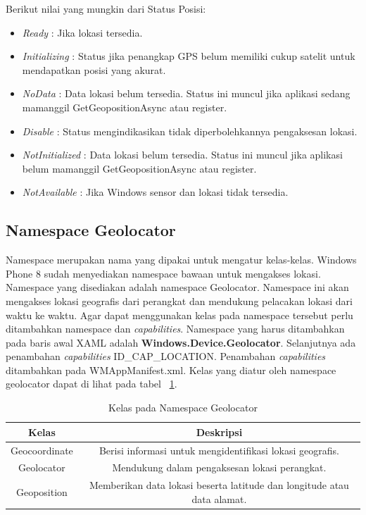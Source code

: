 Berikut nilai yang mungkin dari Status Posisi:
\begin{itemize}
	\item \textit{Ready} : Jika lokasi tersedia.
	\item \textit{Initializing} : Status jika penangkap GPS belum memiliki cukup satelit untuk mendapatkan posisi yang akurat. 
	\item \textit{NoData} : Data lokasi belum tersedia. Status ini muncul jika aplikasi sedang mamanggil GetGeopositionAsync atau register.
	\item \textit{Disable} : Status mengindikasikan tidak diperbolehkannya pengaksesan lokasi.
	\item \textit{NotInitialized} : Data lokasi belum tersedia. Status ini muncul jika aplikasi belum mamanggil GetGeopositionAsync atau register.
	\item \textit{NotAvailable} : Jika Windows sensor dan lokasi tidak tersedia.
\end{itemize}

\subsection{Namespace Geolocator}
\label{subsec:Namespace Geolocator}
\hspace{0.5cm} Namespace merupakan nama yang dipakai untuk mengatur kelas-kelas. Windows Phone 8 sudah menyediakan namespace bawaan untuk mengakses lokasi. Namespace yang disediakan adalah namespace Geolocator. Namespace ini akan mengakses lokasi geografis dari perangkat dan mendukung pelacakan lokasi dari waktu ke waktu. Agar dapat menggunakan kelas pada namespace tersebut perlu ditambahkan namespace dan \textit{capabilities}. Namespace yang harus ditambahkan pada baris awal XAML adalah \textbf{Windows.Device.Geolocator}. Selanjutnya ada penambahan \textit{capabilities} ID\_CAP\_LOCATION. Penambahan \textit{capabilities} ditambahkan pada WMAppManifest.xml. Kelas yang diatur oleh namespace geolocator dapat di lihat pada tabel ~\ref{tab:KelasPadaNamespaceGeolocator}.
\begin{table}[h]
	\centering
		\begin{tabular}{ |c||c|}
				\hline
				Kelas & Deskripsi \\ \hline
				Geocoordinate & Berisi informasi untuk mengidentifikasi lokasi geografis. \\ \hline
				Geolocator & Mendukung dalam pengaksesan lokasi perangkat. \\ \hline
				Geoposition & Memberikan data lokasi beserta latitude dan longitude atau data alamat. \\ \hline
				\hline
		\end{tabular}
	\caption{Kelas pada Namespace Geolocator}
	\label{tab:KelasPadaNamespaceGeolocator}
\end{table}

